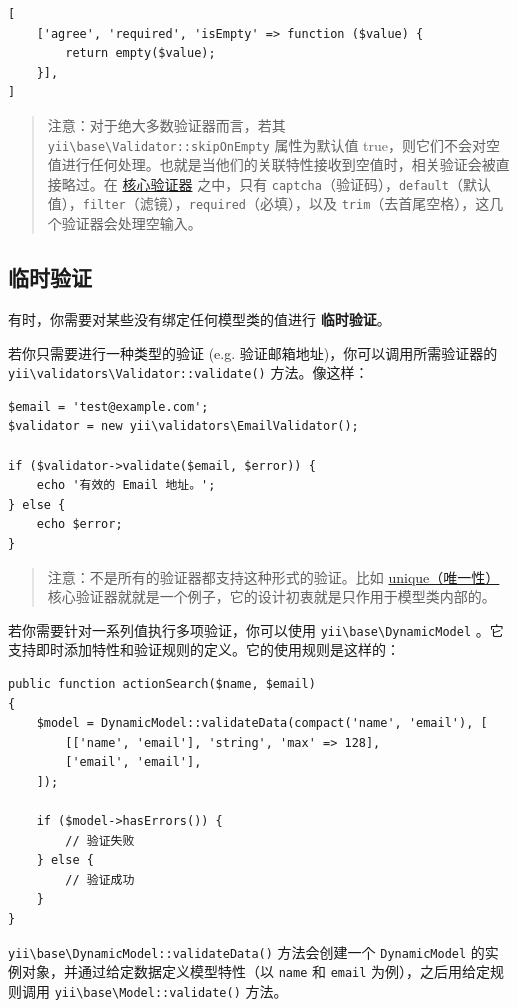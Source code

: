 \lstset{language=php}\begin{lstlisting}
[
    ['agree', 'required', 'isEmpty' => function ($value) {
        return empty($value);
    }],
]
\end{lstlisting}
\begin{quote}注意：对于绝大多数验证器而言，若其 \texttt{yii{\allowbreak{}\textbackslash}base{\allowbreak{}\textbackslash}Validator\allowbreak{}::\allowbreak{}skipOnEmpty} 属性为默认值
true，则它们不会对空值进行任何处理。也就是当他们的关联特性接收到空值时，相关验证会被直接略过。在
\hyperref[tutorial-core-validators.md]{核心验证器} 之中，只有 \lstinline|captcha|（验证码），\lstinline|default|（默认值），\lstinline|filter|（滤镜），\lstinline|required|（必填），以及 \lstinline|trim|（去首尾空格），这几个验证器会处理空输入。

\end{quote}
\subsection{临时验证 \label{input-validation.md::ad-hoc-validation}}
有时，你需要对某些没有绑定任何模型类的值进行 \textbf{临时验证}。

若你只需要进行一种类型的验证 (e.g. 验证邮箱地址)，你可以调用所需验证器的
\texttt{yii{\allowbreak{}\textbackslash}validators{\allowbreak{}\textbackslash}Validator\allowbreak{}::\allowbreak{}validate()} 方法。像这样：

\lstset{language=php}\begin{lstlisting}
$email = 'test@example.com';
$validator = new yii\validators\EmailValidator();

if ($validator->validate($email, $error)) {
    echo '有效的 Email 地址。';
} else {
    echo $error;
}
\end{lstlisting}
\begin{quote}注意：不是所有的验证器都支持这种形式的验证。比如 \hyperref[tutorial-core-validators.md::unique]{unique（唯一性）}核心验证器就就是一个例子，它的设计初衷就是只作用于模型类内部的。

\end{quote}
若你需要针对一系列值执行多项验证，你可以使用 \texttt{yii{\allowbreak{}\textbackslash}base{\allowbreak{}\textbackslash}DynamicModel}
。它支持即时添加特性和验证规则的定义。它的使用规则是这样的：

\lstset{language=php}\begin{lstlisting}
public function actionSearch($name, $email)
{
    $model = DynamicModel::validateData(compact('name', 'email'), [
        [['name', 'email'], 'string', 'max' => 128],
        ['email', 'email'],
    ]);

    if ($model->hasErrors()) {
        // 验证失败
    } else {
        // 验证成功
    }
}
\end{lstlisting}
\texttt{yii{\allowbreak{}\textbackslash}base{\allowbreak{}\textbackslash}DynamicModel\allowbreak{}::\allowbreak{}validateData()} 方法会创建一个 \lstinline|DynamicModel| 的实例对象，并通过给定数据定义模型特性（以 \lstinline|name| 和 \lstinline|email| 为例），之后用给定规则调用
\texttt{yii{\allowbreak{}\textbackslash}base{\allowbreak{}\textbackslash}Model\allowbreak{}::\allowbreak{}validate()} 方法。

